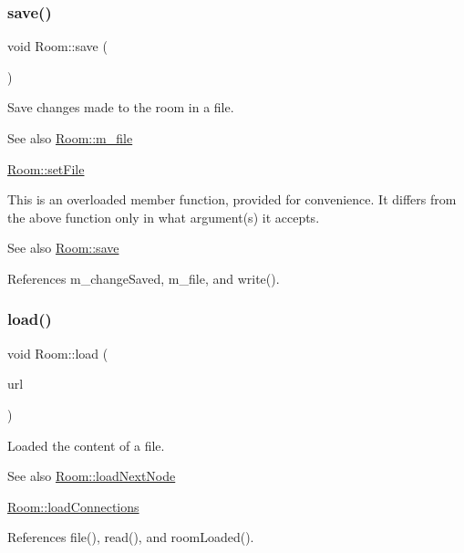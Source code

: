 \subsubsection{\texorpdfstring{save()}{save()}}
{\footnotesize\ttfamily void Room\+::save (\begin{DoxyParamCaption}{ }\end{DoxyParamCaption})}



Save changes made to the room in a file. 

\begin{DoxySeeAlso}{See also}
\mbox{\hyperlink{classRoom_a66ea178fb6c6c69842498b87abac816a}{Room\+::m\+\_\+file}} 

\mbox{\hyperlink{classRoom_afe61f8f1359a431ef906ee2ff485eb80}{Room\+::set\+File}}
\end{DoxySeeAlso}
This is an overloaded member function, provided for convenience. It differs from the above function only in what argument(s) it accepts.

\begin{DoxySeeAlso}{See also}
\mbox{\hyperlink{classRoom_ad795aa64d503519ba0777e3f1d81e54c}{Room\+::save}} 
\end{DoxySeeAlso}


References m\+\_\+change\+Saved, m\+\_\+file, and write().

\mbox{\label{classRoom_a26065830b40a3a127ee2686d9feb4b74}} 
\subsubsection{\texorpdfstring{load()}{load()}}
{\footnotesize\ttfamily void Room\+::load (\begin{DoxyParamCaption}\item[{const Q\+Url \&}]{url }\end{DoxyParamCaption})}



Loaded the content of a file. 

\begin{DoxySeeAlso}{See also}
\mbox{\hyperlink{classRoom_ab1f1a0f0b4db3483b0f09667d81f2d61}{Room\+::load\+Next\+Node}} 

\mbox{\hyperlink{classRoom_a55b3be4272343997434bd5f690ba954e}{Room\+::load\+Connections}} 
\end{DoxySeeAlso}


References file(), read(), and room\+Loaded().

